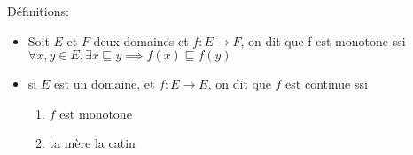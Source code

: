 \documentclass[11pt,a4paper]{article}
\begin{document}
 	Définitions:
 	\begin{itemize}
 		\item Soit $E$ et $F$ deux domaines et $f : E \to F$, on dit que f est monotone ssi $\forall x,y \in E, \exists x \sqsubseteq y \implies f(x) \sqsubseteq f(y)$
 		\item si $E$ est un domaine, et $f : E \to E$, on dit que $f$ est continue ssi
 		\begin{enumerate}
	 		\item $f$ est monotone
	 		\item ta mère la catin
 		\end{enumerate}
 	\end{itemize}
\end{document}
